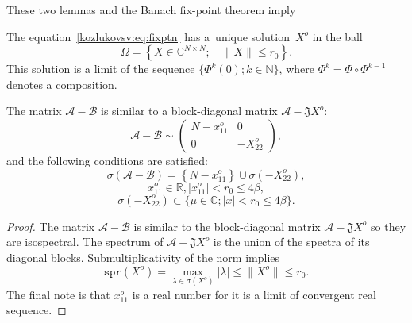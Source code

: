 These two lemmas and the Banach fix-point theorem imply
\begin{lem}
    The equation~\eqref{kozlukovsv:eq:fixptn} has a~unique solution~\( X^o \)
    in the ball
    \[
        \Omega = \left\{ X\in\mathbb{C}^{N{\times}N}; \quad \|X\| \leq r_0 \right\}.
        \]
    This solution is a limit of the sequence \( \{ \Phi^k(0); k\in\mathbb{N} \} \),
    where \( \Phi^k = \Phi\circ\Phi^{k-1} \) denotes a composition.
\end{lem}

\begin{crl}
The matrix \( \mathcal{A} - \mathcal{B} \) is similar
    to a block-diagonal matrix \( \mathcal{A} - \mathfrak{J} X^o \):
\[
    \mathcal{A} - \mathcal{B} \sim
    \begin{pmatrix}
    N - x_{11}^o & 0 \\
    0 & -X_{22}^o
    \end{pmatrix},
    \]
and the following conditions are satisfied:
\[
    \sigma\left(\mathcal{A} - \mathcal{B}\right) = \left\{N-x_{11}^o\right\}\cup \sigma\left(-X_{22}^o\right),
    \]
\[
    x_{11}^o\in\mathbb{R}, \lvert x_{11}^o \rvert < r_0 \leq 4\beta,
    \]
\[
    \sigma\left(-X_{22}^o\right) \subset \{ \mu\in\mathbb{C}; \lvert x \rvert < r_0 \leq 4\beta \}.
    \]
\end{crl}
\begin{proof}
    The matrix \( \mathcal{A} - \mathcal{B} \) is similar to the block-diagonal matrix \( \mathcal{A} - \mathfrak{J} X^o \)
        so they are isospectral.
    The spectrum of \( \mathcal{A} - \mathfrak{J} X^o \)
        is the union of the spectra of its diagonal blocks.
    Submultiplicativity of the norm implies
    \[
        \mathtt{spr}(X^o) = \max_{\lambda\in\sigma(X^o)}\lvert\lambda\rvert \leq \|X^o\| \leq r_0.
        \]
    The final note is that \( x_{11}^o \) is a real number for it is a limit of convergent real sequence.
\end{proof}
